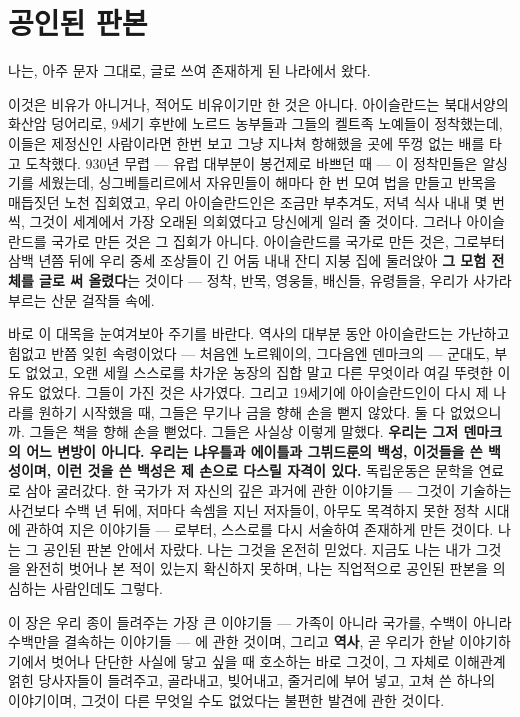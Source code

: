 \chapter{공인된 판본}

나는, 아주 문자 그대로, 글로 쓰여 존재하게 된 나라에서 왔다.

이것은 비유가 아니거나, 적어도 비유이기만 한 것은 아니다. 아이슬란드는 북대서양의 화산암 덩어리로, 9세기 후반에 노르드 농부들과 그들의 켈트족 노예들이 정착했는데, 이들은 제정신인 사람이라면 한번 보고 그냥 지나쳐 항해했을 곳에 뚜껑 없는 배를 타고 도착했다. 930년 무렵 — 유럽 대부분이 봉건제로 바쁘던 때 — 이 정착민들은 알싱기를 세웠는데, 싱그베틀리르에서 자유민들이 해마다 한 번 모여 법을 만들고 반목을 매듭짓던 노천 집회였고, 우리 아이슬란드인은 조금만 부추겨도, 저녁 식사 내내 몇 번씩, 그것이 세계에서 가장 오래된 의회였다고 당신에게 일러 줄 것이다. 그러나 아이슬란드를 국가로 만든 것은 그 집회가 아니다. 아이슬란드를 국가로 만든 것은, 그로부터 삼백 년쯤 뒤에 우리 중세 조상들이 긴 어둠 내내 잔디 지붕 집에 둘러앉아 \textbf{그 모험 전체를 글로 써 올렸다}는 것이다 — 정착, 반목, 영웅들, 배신들, 유령들을, 우리가 사가라 부르는 산문 걸작들 속에.

바로 이 대목을 눈여겨보아 주기를 바란다. 역사의 대부분 동안 아이슬란드는 가난하고 힘없고 반쯤 잊힌 속령이었다 — 처음엔 노르웨이의, 그다음엔 덴마크의 — 군대도, 부도 없었고, 오랜 세월 스스로를 차가운 농장의 집합 말고 다른 무엇이라 여길 뚜렷한 이유도 없었다. 그들이 가진 것은 사가였다. 그리고 19세기에 아이슬란드인이 다시 제 나라를 원하기 시작했을 때, 그들은 무기나 금을 향해 손을 뻗지 않았다. 둘 다 없었으니까. 그들은 책을 향해 손을 뻗었다. 그들은 사실상 이렇게 말했다. \textbf{우리는 그저 덴마크의 어느 변방이 아니다. 우리는 냐우틀과 에이틀과 그뷔드룬의 백성, 이것들을 쓴 백성이며, 이런 것을 쓴 백성은 제 손으로 다스릴 자격이 있다.} 독립운동은 문학을 연료로 삼아 굴러갔다. 한 국가가 저 자신의 깊은 과거에 관한 이야기들 — 그것이 기술하는 사건보다 수백 년 뒤에, 저마다 속셈을 지닌 저자들이, 아무도 목격하지 못한 정착 시대에 관하여 지은 이야기들 — 로부터, 스스로를 다시 서술하여 존재하게 만든 것이다. 나는 그 공인된 판본 안에서 자랐다. 나는 그것을 온전히 믿었다. 지금도 나는 내가 그것을 완전히 벗어나 본 적이 있는지 확신하지 못하며, 나는 직업적으로 공인된 판본을 의심하는 사람인데도 그렇다.

이 장은 우리 종이 들려주는 가장 큰 이야기들 — 가족이 아니라 국가를, 수백이 아니라 수백만을 결속하는 이야기들 — 에 관한 것이며, 그리고 \textbf{역사}, 곧 우리가 한낱 이야기하기에서 벗어나 단단한 사실에 닿고 싶을 때 호소하는 바로 그것이, 그 자체로 이해관계 얽힌 당사자들이 들려주고, 골라내고, 빚어내고, 줄거리에 부어 넣고, 고쳐 쓴 하나의 이야기이며, 그것이 다른 무엇일 수도 없었다는 불편한 발견에 관한 것이다.


